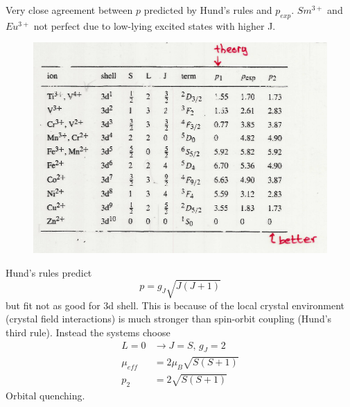 \documentclass[a4paper, 11pt, normalem]{report}
\begin{document}
Very close agreement between $p$ predicted by Hund's rules and $p_{exp}$.
$Sm^{3+}$ and $Eu^{3+}$ not perfect due to low-lying excited states with higher J.
\begin{figure}[H]
    \centering
    \includegraphics[scale=0.4]{mueff2.png}
\end{figure}
Hund's rules predict 
\begin{equation}
    p = g_J\sqrt{J(J+1)}
\end{equation}
but fit not as good for 3d shell.
This is because of the local crystal environment (crystal field interactions) is much stronger than spin-orbit coupling (Hund's third rule).
Instead the systems choose
\begin{align}
    L = 0 &\to J = S,\, g_J = 2 \\
    \mu_{eff} &= 2\mu_B\sqrt{S(S+1)} \\
    p_2 &= 2\sqrt{S(S+1)}
\end{align}
Orbital quenching. 
\end{document}
